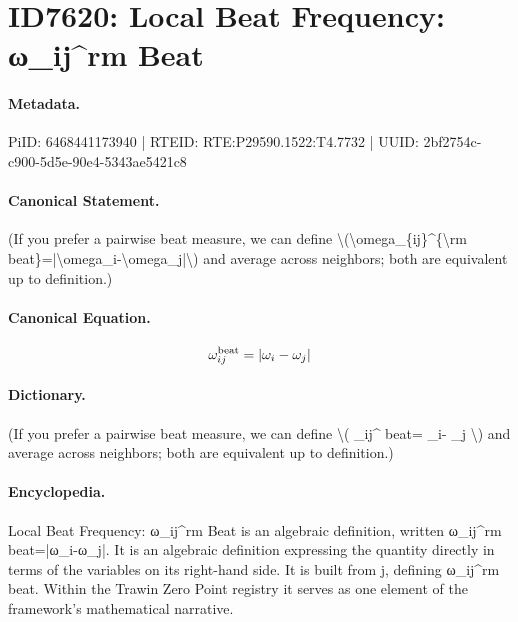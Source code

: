 \section*{ID7620: Local Beat Frequency: ω\_ij\textasciicircum{}rm Beat}
\paragraph{Metadata.}
PiID: 6468441173940 | RTEID: RTE:P29590.1522:T4.7732 | UUID: 2bf2754c-c900-5d5e-90e4-5343ae5421c8

\paragraph{Canonical Statement.}
(If you prefer a pairwise beat measure, we can define \textbackslash{}(\textbackslash{}omega\_\{ij\}\textasciicircum{}\{\textbackslash{}rm beat\}=|\textbackslash{}omega\_i-\textbackslash{}omega\_j|\textbackslash{}) and average across neighbors; both are equivalent up to definition.)

\paragraph{Canonical Equation.}
\[
\omega_{ij}^{\rm beat}=|\omega_i-\omega_j|
\]

\paragraph{Dictionary.}
(If you prefer a pairwise beat measure, we can define \textbackslash{}( \_ij\textasciicircum{} beat= \_i- \_j \textbackslash{}) and average across neighbors; both are equivalent up to definition.)

\paragraph{Encyclopedia.}
Local Beat Frequency: ω\_ij\textasciicircum{}rm Beat is an algebraic definition, written ω\_ij\textasciicircum{}rm beat=|ω\_i-ω\_j|. It is an algebraic definition expressing the quantity directly in terms of the variables on its right-hand side. It is built from j, defining ω\_ij\textasciicircum{}rm beat. Within the Trawin Zero Point registry it serves as one element of the framework's mathematical narrative.

